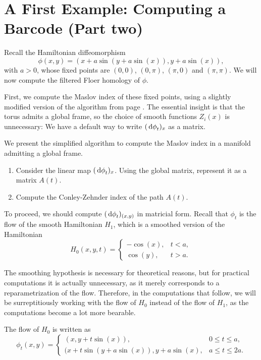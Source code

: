 
\section{A First Example: Computing a Barcode (Part two)}

Recall the Hamiltonian diffeomorphism
\begin{equation}
\phi(x,y) = ( x + a \sin(y + a \sin(x)), y + a \sin(x)),
\end{equation}
with $a > 0$, whose fixed points are $(0,0)$, $(0,\pi)$, $(\pi, 0)$ and $(\pi,\pi)$. We will now compute the filtered Floer homology of $\phi$.

First, we compute the Maslov index of these fixed points, using a slightly modified version of the algorithm from page \pageref{page:maslovalg}. The essential insight is that the torus admits a global frame, so the choice of smooth functions $Z_i(x)$ is unnecessary: We have a default way to write $(\dl \phi_t)_x$ as a matrix.

We present the simplified algorithm to compute the Maslov index in a manifold admitting a global frame.
\begin{enumerate}[algorithm]\label{page:maslovalg2}
\item Consider the linear map $(\dl \phi_t)_x$. Using the global matrix, represent it as a matrix $A(t)$.
\item Compute the Conley-Zehnder index of the path $A(t)$.
\end{enumerate}

To proceed, we should compute $(\dl \phi_t)_{(x,y)}$ in matricial form. Recall that $\phi_t$ is the flow of the smooth Hamiltonian $H_1$, which is a smoothed version of the Hamiltonian
\begin{equation}
H_0(x,y,t) = \begin{cases}
-\cos(x), & t < a,\\
\cos(y), & t > a.
\end{cases}
\end{equation}

The smoothing hypothesis is necessary for theoretical reasons, but for practical computations it is actually unnecessary, as it merely corresponds to a reparametrization of the flow. Therefore, in the computations that follow, we will be surreptitiously working with the flow of $H_0$ instead of the flow of $H_1$, as the computations become a lot more bearable.

The flow of $H_0$ is written as
\begin{equation}
\phi_t(x,y) = \begin{cases}
(x,y+t \sin(x)), & 0 \leq t \leq a,\\
(x+t \sin(y+a \sin(x)), y + a \sin(x), & a \leq t \leq 2a.
\end{cases}
\end{equation}

